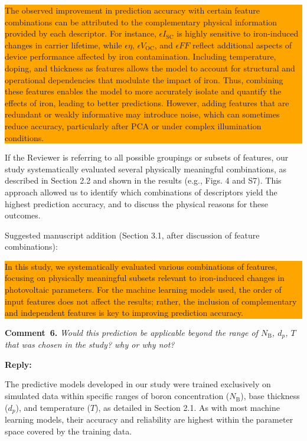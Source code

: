 \documentclass[a4paper,fleqn]{cas-sc}
\begin{document}
\colorbox{orange}{\parbox{\linewidth}{The observed improvement in prediction accuracy with certain feature combinations can be attributed to the complementary physical information provided by each descriptor. 
For instance, $\epsilon I_\mathrm{SC}$ is highly sensitive to iron-induced changes in carrier lifetime, while $\epsilon \eta$, $\epsilon V_\mathrm{OC}$, and $\epsilon FF$ reflect additional aspects of device performance affected by iron contamination. 
Including temperature, doping, and thickness as features allows the model to account for structural and operational dependencies that modulate the impact of iron. 
Thus, combining these features enables the model to more accurately isolate and quantify the effects of iron, leading to better predictions. 
However, adding features that are redundant or weakly informative may introduce noise, which can sometimes reduce accuracy, particularly after PCA or under complex illumination conditions.}}


If the Reviewer is referring to all possible groupings or subsets of features, our study systematically evaluated several physically meaningful combinations, as described in Section 2.2 and shown in the results (e.g., Figs. 4 and S7). 
This approach allowed us to identify which combinations of descriptors yield the highest prediction accuracy, and to discuss the physical reasons for these outcomes.


Suggested manuscript addition (Section 3.1, after discussion of feature combinations):

\colorbox{orange}{\parbox{\linewidth}{In this study, we systematically evaluated various combinations of features, focusing on physically meaningful subsets relevant to iron-induced changes in photovoltaic parameters. 
For the machine learning models used, the order of input features does not affect the results; rather, the inclusion of complementary and independent features is key to improving prediction accuracy.}}

\vspace{1cm}
\noindent
\textcolor[rgb]{0.00,0.50,1.00}{\textbf{Comment~6.}}
\emph{Would this prediction be applicable beyond the range of $N_\mathrm{B}$, $d_p$, $T$ that was chosen in the study? why or why not?}

\noindent
\textcolor[rgb]{0.51,0.00,0.00}{\textbf{Reply:}}


The predictive models developed in our study were trained exclusively on simulated data within specific ranges of boron concentration ($N_\mathrm{B}$), base thickness ($d_p$), and temperature ($T$), as detailed in Section 2.1. 
As with most machine learning models, their accuracy and reliability are highest within the parameter space covered by the training data.
\end{document}
